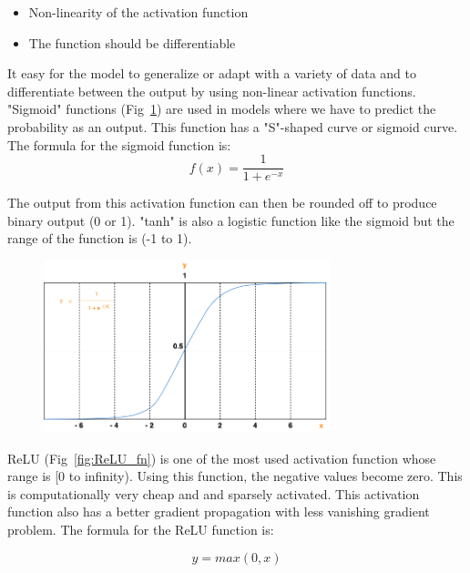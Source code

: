 \begin{itemize}
    \item Non-linearity of the activation function
    \item The function should be differentiable
\end{itemize}

It easy for the model to generalize or adapt with a variety of data and to differentiate between the output by using non-linear activation functions. "Sigmoid" functions (Fig~\ref{fig:sigmoid_fn}) are used in models where we have to predict the probability as an output. This function has a "S"-shaped curve or sigmoid curve. The formula for the sigmoid function is:
\begin{equation}
f(x) = \frac{1}{1 + e ^ {-x}}
\end{equation}

The output from this activation function can then be rounded off to produce binary output (0 or 1). "tanh" is also a logistic function like the sigmoid but the range of the function is (-1 to 1). 

\begin{figure}[ht]
\centering
  \includegraphics[width=0.7\linewidth, height=5cm]{BachelorMasterThesis/TheoreticalBackground/Figures/sigmoid_fn.png}
  \label{fig:sigmoid_fn}
\end{figure}

ReLU (Fig~\ref{fig:ReLU_fn}) is one of the most used activation function whose range is [0 to infinity). Using this function, the negative values become zero. This is computationally very cheap and and sparsely activated. This activation function also has a better gradient propagation with less vanishing gradient problem. The formula for the ReLU function is: 

\begin{equation}
 y = max(0, x)
 \end{equation}

